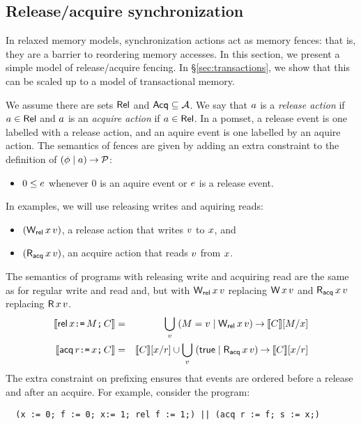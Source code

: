 \subsection{Release/acquire synchronization}

In relaxed memory models, synchronization actions act as memory fences: that
is, they are a barrier to reordering memory accesses.  In this section, we
present a simple model of release/acquire fencing. In
\S\ref{sec:transactions}, we show that this can be scaled up to a model of
transactional memory.

We assume there are sets $\mathsf{Rel}$ and $\mathsf{Acq} \subseteq\mathcal{A}$.  We say that
$a$ is a \emph{release action} if $a\in\mathsf{Rel}$ and $a$ is an
\emph{acquire action} if $a\in\mathsf{Rel}$.
In a pomset, a release event is one labelled with a release action,
and an aquire event is one labelled by an aquire action.
The semantics of fences are given by adding an extra constraint
to the definition of $(\phi\mid a)\mathbin\rightarrow\mathcal{P}$:
\begin{itemize}
\item $0 \le e$ whenever $0$ is an aquire event or $e$ is a release event.
\end{itemize}
In examples, we will use
releasing writes and aquiring reads:
\begin{itemize}
\item $(\DWRel{\aLoc}{\aVal})$, a release action that writes $v$ to $x$, and
\item $(\DRAcq{\aLoc}{\aVal})$, an acquire action that reads $v$ from $x$.
\end{itemize}
The semantics of programs with releasing write and acquiring read are the
same as for regular write and read and, but with $\DWRel\aLoc\aVal$ replacing
$\DW\aLoc\aVal$ and $\DRAcq\aLoc\aVal$ replacing $\DR\aLoc\aVal$.  
\begin{eqnarray*}
  \sem{\REL\aLoc\GETS\aExp\SEMI \aCmd} & = & \bigcup_\aVal\; (\aExp=\aVal \mid \DWRel\aLoc\aVal) \prefix \sem{\aCmd}[\aExp/\aLoc] \\
  \sem{\ACQ\aReg\GETS\aLoc\SEMI \aCmd} & = & \sem{\aCmd}[\aLoc/\aReg] \cup \bigcup_\aVal\; (\TRUE \mid \DRAcq\aLoc\aVal) \prefix \sem{\aCmd}[\aLoc/\aReg] \\
\end{eqnarray*}
The extra constraint on prefixing ensures that events are ordered before a
release and after an acquire.  For example, consider the program:
\begin{verbatim}
  (x := 0; f := 0; x:= 1; rel f := 1;) || (acq r := f; s := x;)
\end{verbatim}
